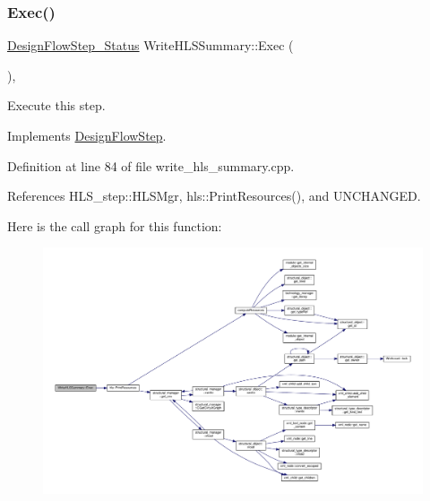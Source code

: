 \subsubsection{\texorpdfstring{Exec()}{Exec()}}
{\footnotesize\ttfamily \hyperlink{design__flow__step_8hpp_afb1f0d73069c26076b8d31dbc8ebecdf}{Design\+Flow\+Step\+\_\+\+Status} Write\+H\+L\+S\+Summary\+::\+Exec (\begin{DoxyParamCaption}{ }\end{DoxyParamCaption})\hspace{0.3cm}{\ttfamily [override]}, {\ttfamily [virtual]}}



Execute this step. 



Implements \hyperlink{classDesignFlowStep_a77d7e38493016766098711ea24f60b89}{Design\+Flow\+Step}.



Definition at line 84 of file write\+\_\+hls\+\_\+summary.\+cpp.



References H\+L\+S\+\_\+step\+::\+H\+L\+S\+Mgr, hls\+::\+Print\+Resources(), and U\+N\+C\+H\+A\+N\+G\+ED.

Here is the call graph for this function\+:
\nopagebreak
\begin{figure}[H]
\begin{center}
\leavevmode
\includegraphics[width=350pt]{d9/d1c/classWriteHLSSummary_ab846705e6c5c2b406578e5bf2a62ec2d_cgraph}
\end{center}
\end{figure}
\mbox{\label{classWriteHLSSummary_ac901ee249803853d6cecec187c530fff}} 
